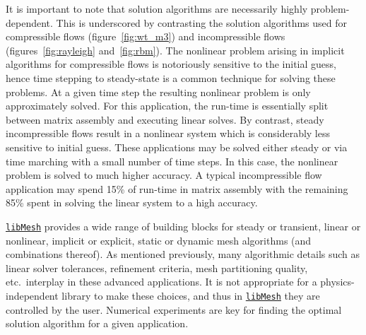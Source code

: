 \documentclass[global,twocolumn,final]{svjour}
\newcommand{\libMesh}{\href{http://libmesh.sourceforge.net}{\texttt{lib\-Mesh}}}
\begin{document}
It is important to note that solution algorithms are necessarily
highly problem-dependent. This is underscored by contrasting the
solution algorithms used for compressible flows
(figure~\ref{fig:wt_m3}) and incompressible flows
(figures~\ref{fig:rayleigh} and~\ref{fig:rbm}). The nonlinear problem
arising in implicit algorithms for compressible flows is notoriously
sensitive to the initial guess, hence time stepping to steady-state is
a common technique for solving these problems.  At a given time step
the resulting nonlinear problem is only approximately solved.  For
this application, the run-time is essentially split between matrix
assembly and executing linear solves.  By contrast, steady
incompressible flows result in a nonlinear system which is
considerably less sensitive to initial guess.  These applications may
be solved either steady or via time marching with a small number of
time steps.  In this case, the nonlinear problem is solved to much
higher accuracy.  A typical incompressible flow application may spend
15\% of run-time in matrix assembly with the remaining 85\% spent in
solving the linear system to a high accuracy.

 \libMesh{} provides a wide range of building blocks for steady or
transient, linear or nonlinear, implicit or explicit, static or
dynamic mesh algorithms (and combinations thereof).  As mentioned
previously, many algorithmic details such as linear solver tolerances,
refinement criteria, mesh partitioning quality, etc.\ interplay in
these advanced applications.  It is not appropriate for a
physics-independent library to make these choices, and thus in
\libMesh{} they are controlled by the user. Numerical experiments are
key for finding the optimal solution algorithm for a given
application.
%

\end{document}
